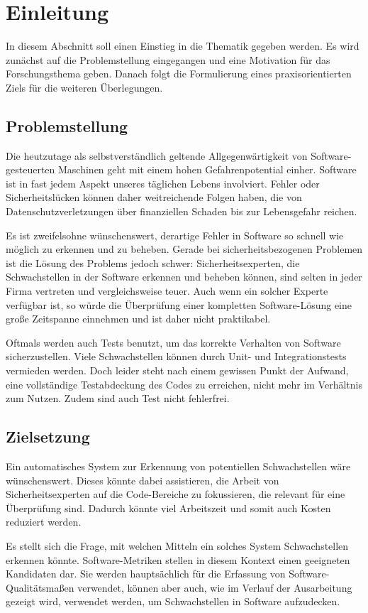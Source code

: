 \section{Einleitung}
\label{sec:einleitung}
In diesem Abschnitt soll einen Einstieg in die Thematik gegeben werden.
Es wird zunächst auf die Problemstellung eingegangen und eine Motivation für das Forschungsthema geben.
Danach folgt die Formulierung eines praxisorientierten Ziels für die weiteren Überlegungen.

\subsection{Problemstellung}
Die heutzutage als selbstverständlich geltende Allgegenwärtigkeit von Software-gesteuerten Maschinen geht mit einem hohen Gefahrenpotential einher.
Software ist in fast jedem Aspekt unseres täglichen Lebens involviert.
Fehler oder Sicherheitslücken können daher weitreichende Folgen haben, die von Datenschutzverletzungen über finanziellen Schaden bis zur Lebensgefahr reichen.

Es ist zweifelsohne wünschenswert, derartige Fehler in Software so schnell wie möglich zu erkennen und zu beheben.
Gerade bei sicherheitsbezogenen Problemen ist die Lösung des Problems jedoch schwer:
Sicherheitsexperten, die Schwachstellen in der Software erkennen und beheben können, sind selten in jeder Firma vertreten und vergleichsweise teuer.
Auch wenn ein solcher Experte verfügbar ist, so würde die Überprüfung einer kompletten Software-Lösung eine große Zeitspanne einnehmen und ist daher nicht praktikabel.

Oftmals werden auch Tests benutzt, um das korrekte Verhalten von Software sicherzustellen.
Viele Schwachstellen können durch Unit- und Integrationstests vermieden werden.
Doch leider steht nach einem gewissen Punkt der Aufwand, eine vollständige Testabdeckung des Codes zu erreichen, nicht mehr im Verhältnis zum Nutzen.
Zudem sind auch Test nicht fehlerfrei.

\subsection{Zielsetzung}
Ein automatisches System zur Erkennung von potentiellen Schwachstellen wäre wünschenswert.
Dieses könnte dabei assistieren, die Arbeit von Sicherheitsexperten auf die Code-Bereiche zu fokussieren, die relevant für eine Überprüfung sind.
Dadurch könnte viel Arbeitszeit und somit auch Kosten reduziert werden.

Es stellt sich die Frage, mit welchen Mitteln ein solches System Schwachstellen erkennen könnte.
Software-Metriken stellen in diesem Kontext einen geeigneten Kandidaten dar.
Sie werden hauptsächlich für die Erfassung von Software-Qualitätsmaßen verwendet, können aber auch, wie im Verlauf der Ausarbeitung gezeigt wird, verwendet werden, um Schwachstellen in Software aufzudecken.
